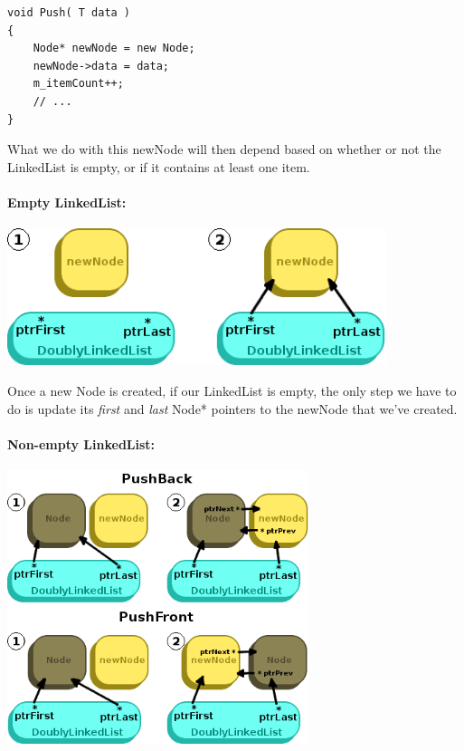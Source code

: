 \documentclass[a4paper,12pt,onepage]{book}
\begin{document}
\begin{lstlisting}[style=code]
void Push( T data )
{
    Node* newNode = new Node;
    newNode->data = data;
    m_itemCount++;
    // ...
}
\end{lstlisting}
    
        What we do with this newNode will then depend based on whether or not the
        LinkedList is empty, or if it contains at least one item.
        
        \paragraph{Empty LinkedList:}
        
            \begin{center}
                \includegraphics[height=4cm]{images/linkedlist-empty-newnode.png}
            \end{center}
            
            Once a new Node is created, if our LinkedList is empty, the only step
            we have to do is update its \textit{first} and \textit{last} Node* pointers
            to the newNode that we've created.
        
        \newpage
        \paragraph{Non-empty LinkedList:}
        
            \begin{center}
                \includegraphics[height=8cm]{images/linkedlist-existing-newnode.png}
            \end{center}
            
\end{document}
